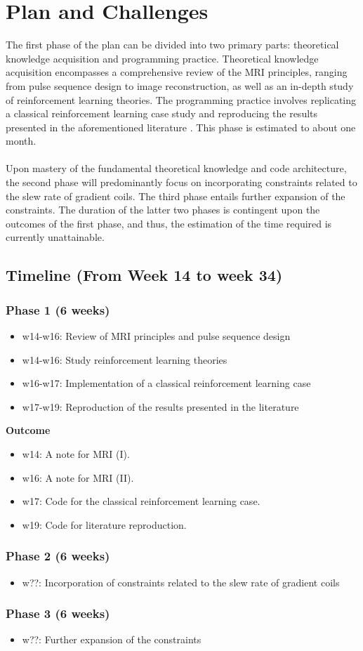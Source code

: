 \section{Plan and Challenges}
The first phase of the plan can be divided into two primary parts: theoretical knowledge acquisition and programming practice. Theoretical knowledge acquisition encompasses a comprehensive review of the MRI principles, ranging from pulse sequence design to image reconstruction, as well as an in-depth study of reinforcement learning theories. The programming practice involves replicating a classical reinforcement learning case study and reproducing the results presented in the aforementioned literature \citep{0438}. This phase is estimated to about one month.
\\\\
Upon mastery of the fundamental theoretical knowledge and code architecture, the second phase will predominantly focus on incorporating constraints related to the slew rate of gradient coils. The third phase entails further expansion of the constraints. The duration of the latter two phases is contingent upon the outcomes of the first phase, and thus, the estimation of the time required is currently unattainable.

\subsection{Timeline (From Week 14 to week 34)}
\subsubsection{Phase 1 (6 weeks)} 
\begin{itemize}
    \item w14-w16: Review of MRI principles and pulse sequence design
    \item w14-w16: Study reinforcement learning theories
    \item w16-w17: Implementation of a classical reinforcement learning case
    \item w17-w19: Reproduction of the results presented in the literature \citep{0438}
\end{itemize}
\textbf{Outcome}
\begin{itemize}
    \item w14: A note for MRI (I).
    \item w16: A note for MRI (II).
    \item w17: Code for the classical reinforcement learning case.
    \item w19: Code for literature reproduction.
\end{itemize}

\subsubsection{Phase 2 (6 weeks)}
\begin{itemize}
    \item w??: Incorporation of constraints related to the slew rate of gradient coils
\end{itemize}

\subsubsection{Phase 3 (6 weeks)}
\begin{itemize}
    \item w??: Further expansion of the constraints
\end{itemize}